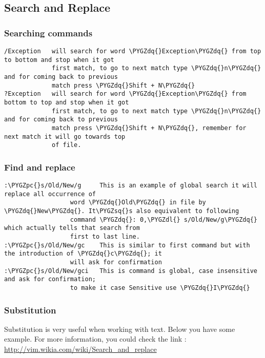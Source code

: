 \documentclass[letterpaper,10pt,english]{sphinxmanual}
\def\PYGZpc{\char`\%}
\def\PYGZdl{\char`\$}
\def\PYGZsq{\char`\'}
\def\PYGZdq{\char`\"}
\renewcommand\PYGZsq{\textquotesingle}
\begin{document}
\subsection{Search and Replace}
\label{editor/vim:search-and-replace}

\subsubsection{Searching commands}
\label{editor/vim:searching-commands}
\begin{Verbatim}[commandchars=\\\{\}]
/Exception   will search for word \PYGZdq{}Exception\PYGZdq{} from top to bottom and stop when it got
             first match, to go to next match type \PYGZdq{}n\PYGZdq{} and for coming back to previous
             match press \PYGZdq{}Shift + N\PYGZdq{}
?Exception   will search for word \PYGZdq{}Exception\PYGZdq{} from bottom to top and stop when it got
             first match, to go to next match type \PYGZdq{}n\PYGZdq{} and for coming back to previous
             match press \PYGZdq{}Shift + N\PYGZdq{}, remember for next match it will go towards top
             of file.
\end{Verbatim}


\subsubsection{Find and replace}
\label{editor/vim:find-and-replace}
\begin{Verbatim}[commandchars=\\\{\}]
:\PYGZpc{}s/Old/New/g     This is an example of global search it will replace all occurrence of
                  word \PYGZdq{}Old\PYGZdq{} in file by \PYGZdq{}New\PYGZdq{}. It\PYGZsq{}s also equivalent to following
                  command \PYGZdq{}: 0,\PYGZdl{} s/Old/New/g\PYGZdq{} which actually tells that search from
                  first to last line.
:\PYGZpc{}s/Old/New/gc    This is similar to first command but with the introduction of \PYGZdq{}c\PYGZdq{}; it
                  will ask for confirmation
:\PYGZpc{}s/Old/New/gci   This is command is global, case insensitive and ask for confirmation;
                  to make it case Sensitive use \PYGZdq{}I\PYGZdq{}
\end{Verbatim}


\subsubsection{Substitution}
\label{editor/vim:substitution}
Substitution is very useful when working with text. Below you have some example. For more information, you could check the link : \href{http://vim.wikia.com/wiki/Search\_and\_replace}{http://vim.wikia.com/wiki/Search\_and\_replace}
\end{document}
